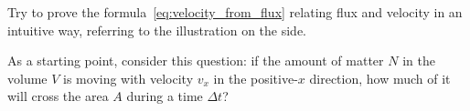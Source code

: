 \documentclass[a4paper,12pt,%
onecolumn,oneside,titlepage,%
british%
]{memoir}
\newcommand*{\incr}{\Delta}%
\renewcommand*{\|}[1][]{\nonscript\:#1\vert\nonscript\:\mathopen{}}
\newcommand*{\yN}{N}
\begin{document}
%
\begin{exercise}
  Try to prove the formula~\eqref{eq:velocity_from_flux} relating flux and velocity in an intuitive way, referring to the illustration on the side.

  As a starting point, consider this question: if the amount of matter $\yN$ in the volume $V$ is moving with velocity $v_{x}$ in the positive-$x$ direction, how much of it will cross the area $A$ during a time $\incr t$?
\end{exercise}

\medskip
\end{document}
